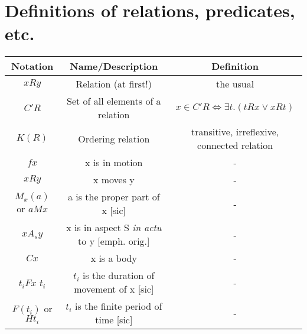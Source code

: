\documentclass[english,ngerman,paper=a4,]{scrartcl}%
\begin{document}
\section{Definitions of relations, predicates, etc.}
\begin{tabular}{|c|c|c|}
\hline 
\textbf{Notation} & \textbf{Name/Description} & \textbf{Definition} \\ 
\hline 
$x R y$ & Relation (at first!) & the usual \\ 
\hline 
$C'R$& Set of all elements of a relation & $x \in C'R \Leftrightarrow \exists t. (t R x \vee x R t)$ \\ 
\hline 
$K(R)$ & Ordering relation & transitive, irreflexive, connected relation \\ 
\hline 
$f x$ & x is in motion &  - \\ 
\hline 
$x R y$ & x moves y&  - \\ 
\hline 
$M_{x}(a)$ or $a M x$ & a is the proper part of x [sic] & -  \\ 
\hline
$xA_{s}y$ & x is in aspect S \emph{in actu} to y [emph. orig.] & -  \\ 
\hline 
$C x$ & x is a body & -  \\ 
\hline 
 $t_{i}Fx$ $t_i$ & $t_i$ is the duration of movement of x [sic] & -  \\ 
\hline 
 $F(t_i)$ or $Ht_i$ & $t_i$ is the finite period of time [sic]& -  \\ 
\hline 
\end{tabular}
%


\end{document}
